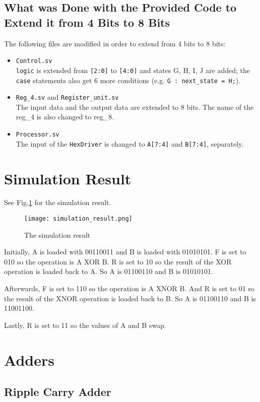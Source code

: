 \documentclass[11pt]{article}
\begin{document}
\subsection{What was Done with the Provided Code to Extend it from 4 Bits to 8 Bits}
The following files are modified in order to extend from 4 bits to 8 bits:
\begin{itemize}
    \item \verb|Control.sv|\\\verb|logic| is extended from \verb|[2:0]| to \verb|[4:0]| and states G, H, I, J are added; the \verb|case| statements also get 6 more conditions (e.g. \verb|G : next_state = H;|).
    \item \verb|Reg_4.sv| and \verb|Register_unit.sv|\\ The input data and the output data are extended to 8 bits. The name of the reg\_4 is also changed to reg\_8.
    \item \verb|Processor.sv|\\The input of the \verb|HexDriver| is changed to \verb|A[7:4]| and \verb|B[7:4]|, separately.
\end{itemize}

\section{Simulation Result}
See Fig.\ref{simulation} for the simulation result.
\begin{figure}[h]
    \centering
    \texttt{[image: simulation\_result.png]}
    \caption{The simulation result}
    \label{simulation}
\end{figure}

Initially, A is loaded with 00110011 and B is loaded with 01010101. F is set to 010 so the operation is A XOR B. R is set to 10 so the result of the XOR operation is loaded back to A. So A is 01100110 and B is 01010101.

Afterwards, F is set to 110 so the operation is A XNOR B. And R is set to 01 so the result of the XNOR operation is loaded back to B. So A is 01100110 and B is 11001100.

Lastly, R is set to 11 so the values of A and B swap.


\section{Adders}
\subsection{Ripple Carry Adder}
\end{document}
